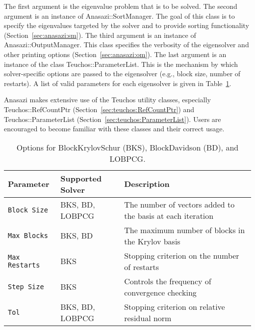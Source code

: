 \noindent The first argument is the eigenvalue problem that is to be solved.
The second argument is an instance of Anasazi::SortManager. The goal of this
class is to specify the eigenvalues targeted by the solver and to provide
sorting functionality (Section~\ref{sec:anasazi:sm}). The third argument is an
instance of Anasazi::OutputManager. This class specifies the verbosity of the
eigensolver and other printing options (Section~\ref{sec:anasazi:om}). The last
argument is an instance of the class Teuchos::ParameterList. This is the
mechanism by which solver-specific options are passed to the eigensolver (e.g.,
block size, number of restarts). A list of valid parameters for each
eigensolver is given in Table~\ref{tab:anasazi:solver_params}.

\begin{remark}
Anasazi makes extensive use of the Teuchos utility classes, especially
Teuchos::RefCountPtr (Section~\ref{sec:teuchos:RefCountPtr}) and
Teuchos::ParameterList (Section~\ref{sec:teuchos:ParameterList}). Users
are encouraged to become familiar with these classes and their correct
usage.
\end{remark}

\begin{table}
\begin{center}
\begin{tabular}{| l | l | p{6cm} |}
\hline
Parameter & Supported Solver & Description \\
\hline
{\tt Block Size}   & BKS, BD, LOBPCG & The number of vectors added to the basis at each iteration \\
{\tt Max Blocks}   & BKS, BD         & The maximum number of blocks in the Krylov basis \\
{\tt Max Restarts} & BKS             & Stopping criterion on the number of restarts \\
{\tt Step Size}    & BKS             & Controls the frequency of convergence checking \\
{\tt Tol}          & BKS, BD, LOBPCG & Stopping criterion on relative residual norm \\
\hline
\end{tabular}
\caption{Options for BlockKrylovSchur (BKS), BlockDavidson (BD), and LOBPCG.}
\label{tab:anasazi:solver_params}
\end{center}
\end{table}

